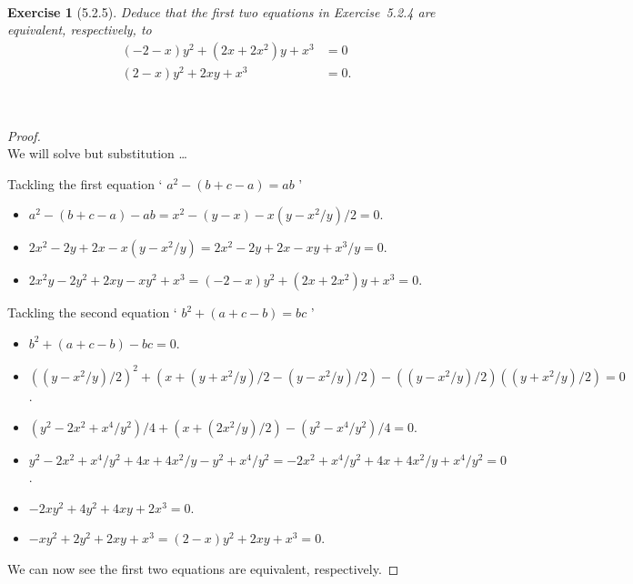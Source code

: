 \documentclass[12pt]{article}
\newcommand{\XB}{\color{black}}
\newcommand{\XBB}{\color{blue}}
\newcommand{\ds}{\displaystyle}
\theoremstyle{plain}
\newtheorem{ex}{Exercise}
\begin{document}
\XBB\hrulefill\XB \\
\begin{ex} [5.2.5]
  Deduce that the first two equations in Exercise~5.2.4 are equivalent, respectively, to
  \begin{align*}
    (-2 - x)y^{2} + (2x + 2x^{2})y + x^{3} &= 0 \\
    (2 - x)y^{2} + 2xy + x^{3} &= 0.
  \end{align*}
\end{ex}
\XBB\hrulefill\XB \\

\begin{proof}
  \ \\

  We will solve but substitution \dots

  Tackling the first equation ` $ a^{2} - (b + c - a) = ab $ '

  \begin{itemize}
    \item $ \ds a^{2} - (b + c - a) - ab = x^{2} - (y - x) - x(y - x^{2} / y) / 2 = 0 $.
    \item $ \ds 2x^{2} - 2y + 2x - x(y - x^{2} / y) = 2x^{2} - 2y + 2x - xy + x^{3} / y =  0 $.
    \item $ \ds 2x^{2}y - 2y^{2} + 2xy - xy^{2} + x^{3} = (-2 - x)y^{2} + (2x + 2x^{2})y + x^{3} = 0 $.
  \end{itemize}

  Tackling the second equation ` $ b^{2} + (a + c - b) = bc $ '

  \begin{itemize}
    \item $ \ds b^{2} + (a + c - b) - bc = 0 $.
    \item $ \ds ((y - x^{2} / y) / 2)^{2} + (x + (y + x^{2} / y) / 2 - (y - x^{2} / y) / 2) - ((y - x^{2} / y) / 2)((y + x^{2} / y) / 2) = 0 $.
    \item $ \ds (y^{2} - 2x^{2} + x^{4} / y^{2}) / 4 + (x + (2x^{2} / y) / 2) - (y^{2} - x^{4} / y^{2}) / 4 = 0 $.
    \item $ \ds y^{2} - 2x^{2} + x^{4} / y^{2} + 4x + 4x^{2} / y - y^{2} + x^{4} / y^{2} = - 2x^{2} + x^{4} / y^{2} + 4x + 4x^{2} / y + x^{4} / y^{2} = 0 $.
    \item $ \ds -2xy^{2} + 4y^{2} + 4xy + 2x^{3} = 0 $.
    \item $ \ds -xy^{2} + 2y^{2} + 2xy + x^{3} = (2 - x)y^{2} + 2xy + x^{3} = 0 $.
  \end{itemize}
  
  We can now see the first two equations are equivalent, respectively.

\end{proof}
\end{document}

